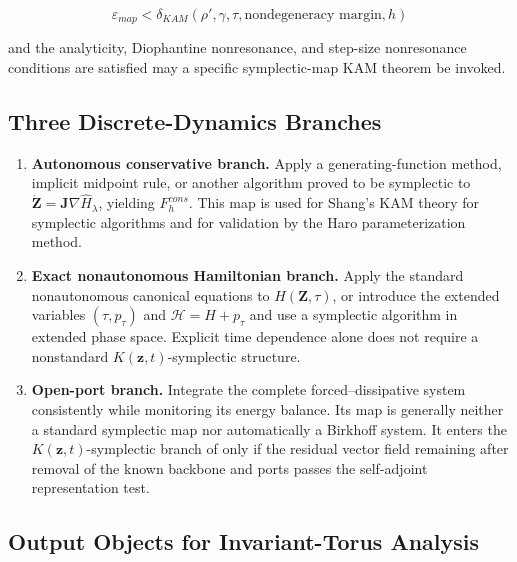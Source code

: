 \begin{equation}
\label{eq:chnn-4-61}
\varepsilon_{map}<\delta_{KAM}\left(\rho\prime,\gamma,\tau,\text{nondegeneracy margin},h\right)
\end{equation}

and the analyticity, Diophantine nonresonance, and step-size nonresonance conditions are satisfied may a specific symplectic-map KAM theorem be invoked.\cite{FengQin2010,Shang1999KAMAlgorithms,Shang2000KAMMappings,Poschel2001KAMLecture}

\subsection{Three Discrete-Dynamics Branches}\label{sec:chnn-4-7}

\begin{enumerate}
\def\labelenumi{\arabic{enumi}.}
\tightlist
\item
  \textbf{Autonomous conservative branch.} Apply a generating-function method, implicit midpoint rule, or another algorithm proved to be symplectic to \(\dot{\mathbf{Z}} = \mathbf{J}\nabla{\widehat{H}}_{\lambda}\), yielding \(F_{h}^{cons}\). This map is used for Shang's KAM theory for symplectic algorithms and for validation by the Haro parameterization method.
\item
  \textbf{Exact nonautonomous Hamiltonian branch.} Apply the standard nonautonomous canonical equations to \(H\left( \mathbf{Z},\tau \right)\), or introduce the extended variables \(\left(\tau,p_{\tau}\right)\) and \(\mathcal{H}=H+p_{\tau}\) and use a symplectic algorithm in extended phase space. Explicit time dependence alone does not require a nonstandard \(K\left( \mathbf{z},t \right)\)-symplectic structure.
\item
  \textbf{Open-port branch.} Integrate the complete forced--dissipative system consistently while monitoring its energy balance. Its map is generally neither a standard symplectic map nor automatically a Birkhoff system. It enters the \(K\left( \mathbf{z},t \right)\)-symplectic branch of  only if the residual vector field remaining after removal of the known backbone and ports passes the self-adjoint representation test.
\end{enumerate}

\subsection{Output Objects for Invariant-Torus Analysis}\label{sec:chnn-4-8}

